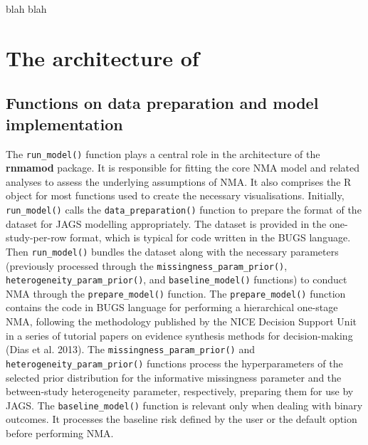 blah blah

\hypertarget{the-architecture-of}{%
\section{\texorpdfstring{The architecture of }{The architecture of }}\label{the-architecture-of}}

\hypertarget{functions-on-data-preparation-and-model-implementation}{%
\subsection{Functions on data preparation and model implementation}\label{functions-on-data-preparation-and-model-implementation}}

The \texttt{run\_model()} function plays a central role in the architecture of the \textbf{rnmamod} package. It is responsible for fitting the core NMA model and related analyses to assess the underlying assumptions of NMA. It also comprises the R object for most functions used to create the necessary visualisations.
Initially, \texttt{run\_model()} calls the \texttt{data\_preparation()} function to prepare the format of the dataset for JAGS modelling appropriately. The dataset is provided in the one-study-per-row format, which is
typical for code written in the BUGS language. Then \texttt{run\_model()} bundles the dataset along with the necessary parameters (previously processed through the \texttt{missingness\_param\_prior()}, \texttt{heterogeneity\_param\_prior()}, and \texttt{baseline\_model()} functions) to conduct NMA through the \texttt{prepare\_model()} function. The \texttt{prepare\_model()} function contains the code in BUGS language for performing a hierarchical one-stage NMA, following the methodology published by the NICE Decision Support Unit in a series of tutorial papers on evidence synthesis methods for decision-making (Dias et al. 2013). The \texttt{missingness\_param\_prior()} and \texttt{heterogeneity\_param\_prior()} functions process the hyperparameters of the selected prior distribution for the informative missingness parameter and the between-study heterogeneity parameter, respectively, preparing them for use by JAGS. The \texttt{baseline\_model()} function is relevant only when dealing with binary outcomes. It processes the baseline risk defined by the user or the default option before performing NMA.

